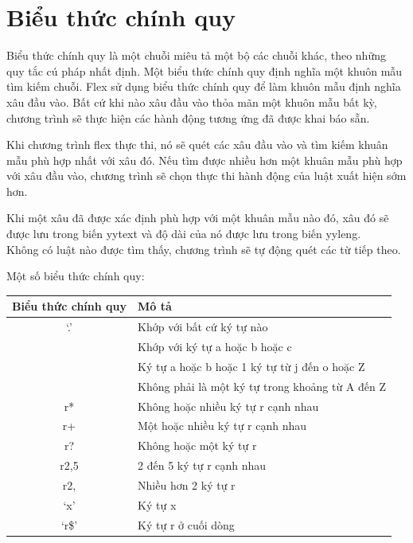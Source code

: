 \documentclass[14pt,a4paper]{extreport}
\begin{document}
\chapter{Biểu thức chính quy}
Biểu thức chính quy là một chuỗi miêu tả một bộ các chuỗi khác, theo những quy tắc cú pháp nhất định. Một biểu thức chính quy định nghĩa một khuôn mẫu tìm kiếm chuỗi. 
Flex sử dụng biểu thức chính quy để làm khuôn mẫu định nghĩa xâu đầu vào. Bất cứ khi nào xâu đầu vào thỏa mãn một khuôn mẫu bất kỳ, chương trình sẽ thực hiện các hành động tương ứng đã được khai báo sẵn.

Khi chương trình flex thực thi, nó sẽ quét các xâu đầu vào và tìm kiếm khuân mẫu phù hợp nhất với xâu đó. Nếu tìm được nhiều hơn một khuân mẫu phù hợp với xâu đầu vào, chương trình sẽ chọn thực thi hành động của luật xuất hiện sớm hơn.

Khi một xâu đã được xác định phù hợp với một khuân mẫu nào đó, xâu đó sẽ được lưu trong biến yytext và độ dài của nó được lưu trong biến yyleng.\\
Không có luật nào được tìm thấy, chương trình sẽ tự động quét các từ tiếp theo.

\newpage
Một số biểu thức chính quy:

\begin{flushleft}
	\begin{tabular}{|c|l|}
	\hline 
	Biểu thức chính quy & Mô tả \\ 
	\hline 
	‘.’ & Khớp với bất cứ ký tự nào \\ 
	\hline 
	[abc] & Khớp với ký tự a hoặc b hoặc c \\ 
	\hline 
	[abj-oZ] & Ký tự a hoặc b hoặc 1 ký tự từ j đến o hoặc Z \\ 
	\hline 
	[\^A-Z] & Không phải là một ký tự trong khoảng từ A đến Z \\ 
	\hline 
	r* & Không hoặc nhiều ký tự r cạnh nhau \\ 
	\hline 
	r+ & Một hoặc nhiều ký tự r cạnh nhau \\ 
	\hline 
	r? & Không hoặc một ký tự r \\ 
	\hline 
	r{2,5} & 2 đến 5 ký tự r cạnh nhau \\ 
	\hline 
	r{2,} & Nhiều hơn 2 ký tự r \\ 
	\hline 
	‘x’ & Ký tự x \\ 
	\hline 
	‘r\$’ & Ký tự r ở cuối dòng \\ 
	\hline 
	\end{tabular} 
\end{flushleft}
\end{document}

